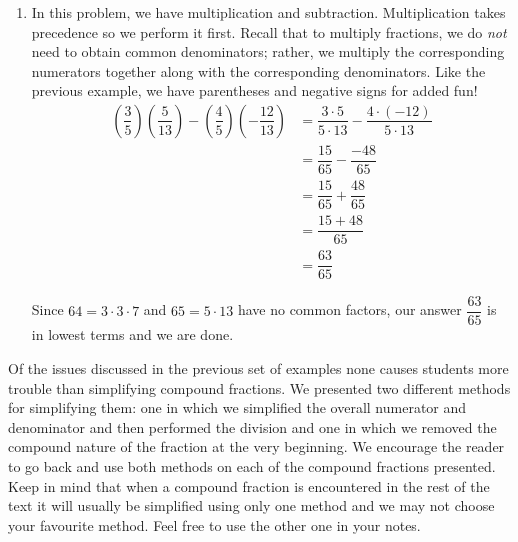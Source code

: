 {\begin{enumerate}
This means that we should simplify the numerator and denominator first, then perform the division last.  We tend to what's in parentheses first, giving multiplication priority over addition and subtraction.
\begin{align*}
\dfrac{(2(2)+1)(-3-(-3)) - 5(4-7)}{4-2(3)} & =  \dfrac{(4+1)(-3+3)-5(-3)}{4 - 6}   \\
	& =  \dfrac{(5)(0) + 15}{-2}   \\ 
	& =  \dfrac{15}{-2}  \\[5pt] 
	& =  -\dfrac{15}{2}  \tag*{Properties of Negatives}
\end{align*}
Since $15 = 3\cdot 5$ and $2$ have no common factors, we are done.
																			



\item  In this problem, we have multiplication and subtraction.  Multiplication takes precedence so we perform it first.  Recall that to multiply fractions, we do \textit{not} need to obtain common denominators;  rather, we multiply the corresponding numerators together along with the corresponding denominators.  Like the previous example, we have parentheses and negative signs for added fun!
\begin{align*}
\left(\dfrac{3}{5} \right) \left(\dfrac{5}{13} \right) - \left(\dfrac{4}{5}\right) \left( - \dfrac{12}{13}\right) & =  \dfrac{3 \cdot 5}{5 \cdot 13} - \dfrac{4\cdot (-12)}{5 \cdot 13}  \tag*{Multiply fractions}\\[5pt] 
& =  \dfrac{15}{65} - \dfrac{-48}{65}  \\[5pt]
& =  \dfrac{15}{65} + \dfrac{48}{65}  \tag*{Properties of Negatives}\\[5pt]
& =  \dfrac{15+48}{65}   \tag*{Add numerators} \\[5pt] 
& =  \dfrac{63}{65} 
\end{align*}

Since $64 = 3 \cdot 3 \cdot 7$ and $65 = 5 \cdot 13$ have no common factors, our answer $\dfrac{63}{65}$ is in lowest terms and we are done.
\end{enumerate}
} 

\medskip

Of the issues discussed in the previous set of examples none causes students more trouble than simplifying compound fractions.  We presented two different methods for simplifying them:  one in which we simplified the overall numerator and denominator and then performed the division and one in which we removed the compound nature of the fraction at the very beginning.   We encourage the reader to go back and use both methods on each of the compound fractions presented.  Keep in mind that when a compound fraction is encountered in the rest of the text it will usually be simplified using only one method and we may not choose your favourite method.  Feel free to use the other one in your notes.




